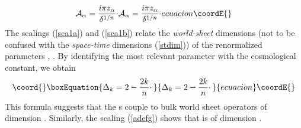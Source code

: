 \documentclass[a4paper,12pt]{article}
\begin{document}
{\begin{equation}
{\label{adefg}
{\cal A}_{\alpha} = {i\pi z_{\alpha}\over\delta^{1/n}}\cdotp
}{
{\cal A}_{\alpha} = {i\pi z_{\alpha}\over\delta^{1/n}}\cdotp
}{ecuacion}\coordE{}\end{equation}
%
The scalings (\ref{sca1a}) and (\ref{sca1b}) relate the 
{\it world-sheet} dimensions (not to be confused with the {\it space-time}
dimensions (\ref{stdim})) of the renormalized parameters \coordHE{},
\coordHE{}. By identifying the most relevant 
parameter \coordHE{} with the cosmological constant, we obtain
%
\begin{equation}\coord{}\boxEquation{
\label{wsdim}
\Delta_{k} = 2-{2k\over n}\cdotp
}{
\Delta_{k} = 2-{2k\over n}\cdotp
}{ecuacion}\coordE{}\end{equation}
%
This formula suggests that the \coordHE{}s couple to bulk world sheet 
operators \coordHE{} of dimension \coordHE{}.
Similarly, the scaling (\ref{adefg}) shows that \coordHE{} is of 
dimension \coordHE{}.

}
\end{document}
